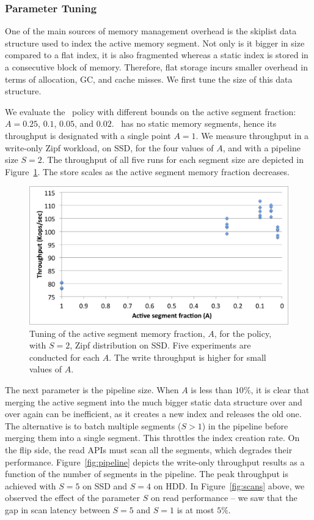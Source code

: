 \subsubsection{Parameter Tuning} \label{ssec:tuning}
One of the main sources of memory management overhead is the skiplist data structure used to index the active  memory segment.
Not only  is it bigger in size compared to a flat index, it is also fragmented whereas a static index is stored in a consecutive block of memory. Therefore, flat storage incurs smaller overhead in terms of allocation, GC, and cache misses.
We first tune the size of this data structure.

We evaluate the \basic\ policy with different bounds on the active segment fraction: $A=0.25$, $0.1$, $0.05$, and $0.02$. 
\none\ has no static memory segments, hence its throughput is designated with a single point  $A=1$.
We measure  throughput in a write-only Zipf workload, on SSD,  for the four values of $A$, and with a pipeline size $S=2$.
The throughput of all five runs for each segment size are depicted in  Figure~\ref{fig:dynamic-fraction}. 
The store scales as the active segment memory fraction decreases. 

\begin{figure}[htb]
\includegraphics[width=\figw]{Figs/dynamic-fraction-1.png}
\caption{Tuning of the active segment memory fraction, $A$, for the \basic\/ policy, with $S=2$,
Zipf distribution on SSD.  Five experiments are conducted for each $A$. 
The write throughput is higher for small values of $A$.
}
\label{fig:dynamic-fraction}
\end{figure}

The next parameter is the pipeline size.
When $A$ is less than $10\%$, it is clear that merging the active segment into the much bigger static data structure
over and over again can be inefficient, as it creates a new index and releases the old one. 
The alternative is to batch multiple segments ($S>1$) in the pipeline before merging them into a single segment. 
This throttles the index creation rate. On the flip side, the read APIs must scan all the segments, 
which degrades their performance.
Figure~\ref{fig:pipeline} depicts the write-only throughput results as a function of the number of segments in the pipeline. 
The peak throughput is achieved with $S=5$ on SSD and $S=4$ on HDD. In Figure~\ref{fig:scans} above, we observed 
the effect of the parameter $S$ on  read performance -- we saw that the gap in scan latency between $S=5$ and $S=1$ is at most $5\%$.

